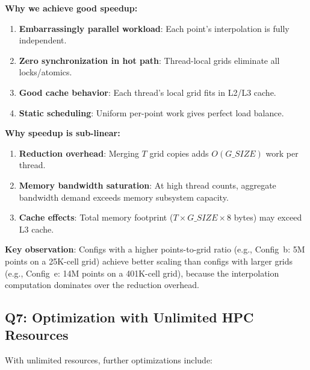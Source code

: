 \documentclass[12pt,a4paper]{article}
\begin{document}
\textbf{Why we achieve good speedup:}
\begin{enumerate}
    \item \textbf{Embarrassingly parallel workload}: Each point's interpolation is fully independent.
    \item \textbf{Zero synchronization in hot path}: Thread-local grids eliminate all locks/atomics.
    \item \textbf{Good cache behavior}: Each thread's local grid fits in L2/L3 cache.
    \item \textbf{Static scheduling}: Uniform per-point work gives perfect load balance.
\end{enumerate}

\textbf{Why speedup is sub-linear:}
\begin{enumerate}
    \item \textbf{Reduction overhead}: Merging $T$ grid copies adds $O(G\_SIZE)$ work per thread.
    \item \textbf{Memory bandwidth saturation}: At high thread counts, aggregate bandwidth demand exceeds memory subsystem capacity.
    \item \textbf{Cache effects}: Total memory footprint ($T \times G\_SIZE \times 8$ bytes) may exceed L3 cache.
\end{enumerate}

\textbf{Key observation}: Configs with a higher points-to-grid ratio (e.g., Config~b: 5M points on a 25K-cell grid) achieve better scaling than configs with larger grids (e.g., Config~e: 14M points on a 401K-cell grid), because the interpolation computation dominates over the reduction overhead.

\subsection{Q7: Optimization with Unlimited HPC Resources}

With unlimited resources, further optimizations include:
\end{document}
